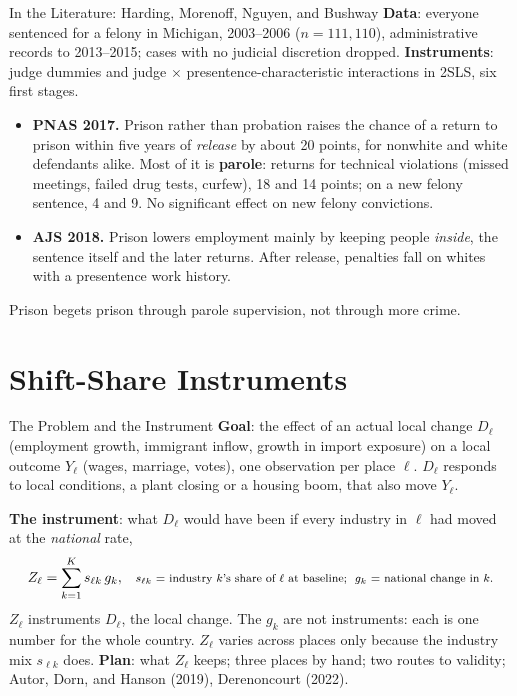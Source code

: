 \documentclass[aspectratio=169,11pt,xcolor=dvipsnames]{beamer}
\begin{document}
\begin{frame}{In the Literature: Harding, Morenoff, Nguyen, and Bushway}
\textbf{Data}: everyone sentenced for a felony in Michigan, 2003--2006
($n = 111{,}110$), administrative records to 2013--2015; cases with no
judicial discretion dropped. \textbf{Instruments}: judge dummies and judge
$\times$ presentence-characteristic interactions in 2SLS, six first stages.
\vskip2pt
\begin{itemize}\itemsep4pt
  \item \textbf{PNAS 2017.} Prison rather than probation raises the chance of a
        return to prison within five years of \emph{release} by about 20
        points, for nonwhite and white defendants alike. Most of it is
        \textbf{parole}: returns for technical violations (missed meetings,
        failed drug tests, curfew), 18 and 14 points; on a new felony
        sentence, 4 and 9. No significant effect on new felony convictions.
  \item \textbf{AJS 2018.} Prison lowers employment mainly by keeping people
        \emph{inside}, the sentence itself and the later returns. After
        release, penalties fall on whites with a presentence work history.
\end{itemize}
\vskip2pt
\alert{Prison begets prison through parole supervision, not through more
crime.}
\end{frame}

\section[Shift-share]{Shift-Share Instruments}
\begin{frame}\sectionpage\end{frame}

\begin{frame}{The Problem and the Instrument}
\textbf{Goal}: the effect of an actual local change $D_\ell$ (employment
growth, immigrant inflow, growth in import exposure) on a local outcome $Y_\ell$ (wages,
marriage, votes), one observation per place $\ell$. $D_\ell$ responds to
local conditions, a plant closing or a housing boom, that also move $Y_\ell$.

\textbf{The instrument}: what $D_\ell$ would have been if every industry in
$\ell$ had moved at the \emph{national} rate,
\begin{align*}
  Z_\ell = \sum_{k=1}^{K} s_{\ell k}\, g_k ,
  && \text{\footnotesize $s_{\ell k}$ = industry $k$'s share of $\ell$ at baseline;\ \ $g_k$ = national change in $k$.}
\end{align*}
\vskip-2pt
\alert{$Z_\ell$ instruments $D_\ell$, the local change.} The $g_k$ are not
instruments: each is one number for the whole country. $Z_\ell$ varies across
places only because the industry mix $s_{\ell k}$ does.
\vskip2pt
\textbf{Plan}: what $Z_\ell$ keeps; three places by hand; two routes to
validity; Autor, Dorn, and Hanson (2019),
Derenoncourt (2022).
\end{frame}
\end{document}
